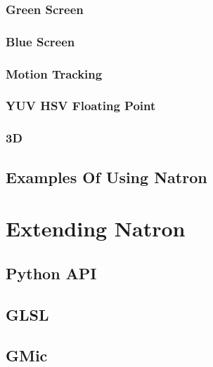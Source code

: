 \documentclass[letterpaper,12pt,oneside]{book}
\begin{document}
\section{Green Screen}

\section{Blue Screen}

\section{Motion Tracking}

\section{YUV HSV Floating Point}

\section{3D}

\chapter{Examples Of Using Natron}




\part{Extending Natron}

\chapter{Python API}




\chapter{GLSL}



\chapter{GMic}
\end{document}
